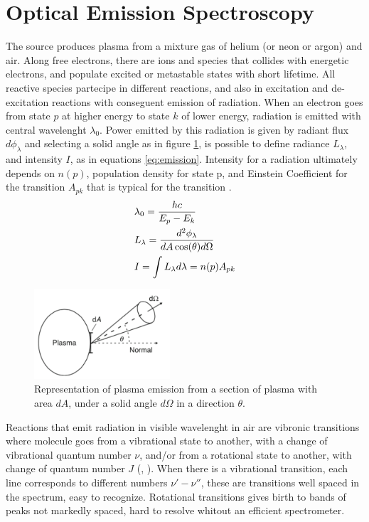 \section{Optical Emission Spectroscopy}
The source produces plasma from a mixture gas of helium (or neon or argon) and air. Along free electrons, there are ions and species that collides with energetic electrons, and populate excited or metastable states with short lifetime. All reactive species partecipe in different reactions, and also in excitation and de-excitation reactions with conseguent emission of radiation. When an electron goes from state $p$ at higher energy to state $k$ of lower energy, radiation is emitted with central wavelenght $\lambda_0$. Power emitted by this radiation is given by radiant flux $d\phi_{\lambda}$ and selecting a solid angle as in figure \ref{fig:emissionfig}, is possible to define radiance $L_{\lambda}$, and intensity $I$, as in equations \ref{eq:emission}. Intensity for a radiation ultimately depends on $n(p)$, population density for state p, and Einstein Coefficient for the transition $A_{pk}$ that is typical for the transition \cite{book:291477}.
\begin{equation}
 \centering
 \begin{split}
 &\lambda_{0} = \frac{hc}{E_p - E_k} \\
 &L_{\lambda} = \frac{d^2\phi_{\lambda}}{dA \cos(\theta) d\Omega} \\
 &I = \int L_{\lambda} d\lambda = n(p) A_{pk}
 \end{split} 
 \label{eq:emission}
\end{equation}
\begin{figure}
 \centering
 \includegraphics[width = 0.45\textwidth]{Images/Spectroscopy/plasmaemission.png}
 \caption{Representation of plasma emission from a section of plasma with area $dA$, under a solid angle $d\Omega$ in a direction $\theta$.}
 \label{fig:emissionfig}
\end{figure}

Reactions that emit radiation in visible wavelenght in air are vibronic transitions where molecule goes from a vibrational state to another, with a change of vibrational quantum number $\nu$, and/or from a rotational state to another, with change of quantum number $J$ (\cite{book:137793}, \cite{wiki:vibronic}). When there is a vibrational transition, each line corresponds to different numbers $\nu'-\nu''$, these are transitions well spaced in the spectrum, easy to recognize. Rotational transitions gives birth to bands of peaks not markedly spaced, hard to resolve whitout an efficient spectrometer.

